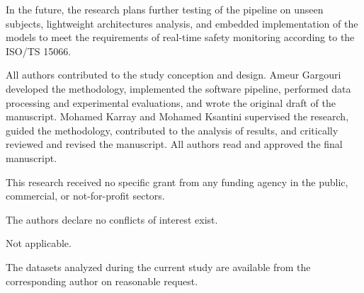 \documentclass[DTMColor]{ROB-New}
\begin{document}
In the future, the research plans further testing of the pipeline on unseen subjects, lightweight architectures analysis, and embedded implementation of the models to meet the requirements of real-time safety monitoring according to the ISO/TS 15066.

\begin{con}
    All authors contributed to the study conception and design. Ameur Gargouri developed the methodology, implemented the software pipeline, performed data processing and experimental evaluations, and wrote the original draft of the manuscript. Mohamed Karray and Mohamed Ksantini supervised the research, guided the methodology, contributed to the analysis of results, and critically reviewed and revised the manuscript. All authors read and approved the final manuscript.

    This research received no specific grant from any funding agency in the public, commercial, or not-for-profit sectors.

    The authors declare no conflicts of interest exist.

    Not applicable.

    The datasets analyzed during the current study are available from the corresponding author on reasonable request.
\end{con}

\newpage



\makeatletter
\NAT@swatrue\let\bibcite\NAT@testdef
\makeatother
\end{document}

